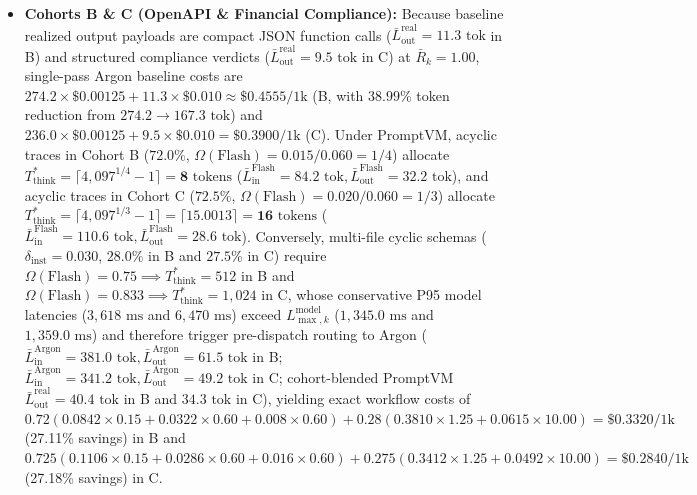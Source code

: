 \documentclass[conference,10pt]{IEEEtran}
\begin{document}
\begin{itemize}
    \item \textbf{Cohorts B \& C (OpenAPI \& Financial Compliance):} Because baseline realized output payloads are compact JSON function calls ($\bar{L}_{\text{out}}^{\text{real}} = 11.3\text{ tok}$ in B) and structured compliance verdicts ($\bar{L}_{\text{out}}^{\text{real}} = 9.5\text{ tok}$ in C) at $\bar{R}_k = 1.00$, single-pass Argon baseline costs are $274.2\times\$0.00125 + 11.3\times\$0.010 \approx \$0.4555/\text{1k}$ (B, with $38.99\%$ token reduction from $274.2 \to 167.3\text{ tok}$) and $236.0\times\$0.00125 + 9.5\times\$0.010 = \$0.3900/\text{1k}$ (C). Under PromptVM, acyclic traces in Cohort B ($72.0\%$, $\Omega(\text{Flash}) = 0.015/0.060 = 1/4$) allocate $T_{\text{think}}^* = \lceil 4{,}097^{1/4} - 1 \rceil = \mathbf{8}\text{ tokens}$ ($\bar{L}_{\text{in}}^{\text{Flash}} = 84.2\text{ tok}, \bar{L}_{\text{out}}^{\text{Flash}} = 32.2\text{ tok}$), and acyclic traces in Cohort C ($72.5\%$, $\Omega(\text{Flash}) = 0.020/0.060 = 1/3$) allocate $T_{\text{think}}^* = \lceil 4{,}097^{1/3} - 1 \rceil = \lceil 15.0013 \rceil = \mathbf{16}\text{ tokens}$ ($\bar{L}_{\text{in}}^{\text{Flash}} = 110.6\text{ tok}, \bar{L}_{\text{out}}^{\text{Flash}} = 28.6\text{ tok}$). Conversely, multi-file cyclic schemas ($\delta_{\text{inst}}=0.030$, $28.0\%$ in B and $27.5\%$ in C) require $\Omega(\text{Flash}) = 0.75 \implies T_{\text{think}}^* = 512$ in B and $\Omega(\text{Flash}) = 0.833 \implies T_{\text{think}}^* = 1{,}024$ in C, whose conservative P95 model latencies ($3{,}618\text{ ms}$ and $6{,}470\text{ ms}$) exceed $L_{\max,k}^{\text{model}}$ ($1{,}345.0\text{ ms}$ and $1{,}359.0\text{ ms}$) and therefore trigger pre-dispatch routing to Argon ($\bar{L}_{\text{in}}^{\text{Argon}} = 381.0\text{ tok}, \bar{L}_{\text{out}}^{\text{Argon}} = 61.5\text{ tok}$ in B; $\bar{L}_{\text{in}}^{\text{Argon}} = 341.2\text{ tok}, \bar{L}_{\text{out}}^{\text{Argon}} = 49.2\text{ tok}$ in C; cohort-blended PromptVM $\bar{L}_{\text{out}}^{\text{real}} = 40.4\text{ tok}$ in B and $34.3\text{ tok}$ in C), yielding exact workflow costs of $0.72(0.0842\times 0.15 + 0.0322\times 0.60 + 0.008\times 0.60) + 0.28(0.3810\times 1.25 + 0.0615\times 10.00) = \$0.3320/\text{1k}$ (27.11\% savings) in B and $0.725(0.1106\times 0.15 + 0.0286\times 0.60 + 0.016\times 0.60) + 0.275(0.3412\times 1.25 + 0.0492\times 10.00) = \$0.2840/\text{1k}$ (27.18\% savings) in C.

\end{itemize}
\end{document}
